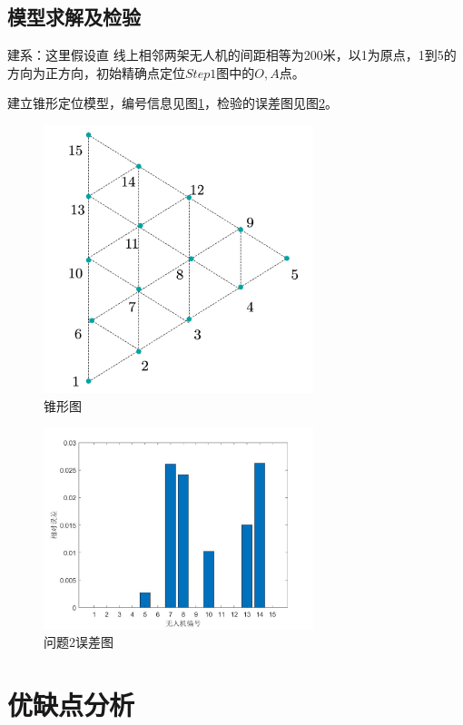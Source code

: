 \documentclass[12pt]{ctexart}
\begin{document}
\begin{spacing}{1.5}
\subsection{模型求解及检验}
建系：这里假设直
线上相邻两架无人机的间距相等为200米，以1为原点，1到5的方向为正方向，初始精确点定位$Step1$图中的$O,A$点。

建立锥形定位模型，编号信息见图\ref{tu16}，检验的误差图见图\ref{tu17}。

\begin{figure}[H]
	\centering
	\includegraphics[width=0.7\textwidth]{锥形图.png}
	\caption{锥形图}
	\label{tu16}
\end{figure}

\begin{figure}[H]
	\centering
	\includegraphics[width=0.7\textwidth]{45.jpg}
	\caption{问题2误差图}
	\label{tu17}
\end{figure}

\section{优缺点分析}

\end{spacing}
\end{document}
